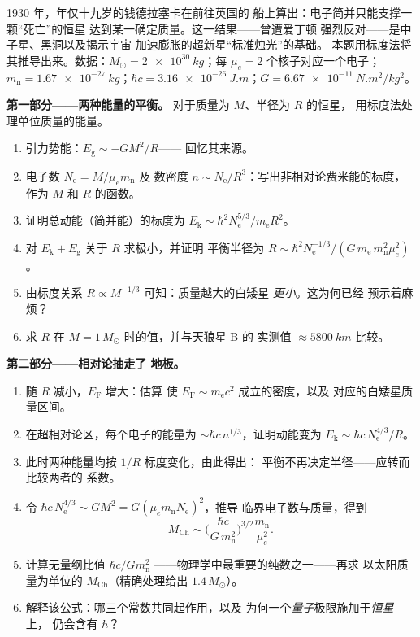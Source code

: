\begin{problem}\label{pb:b3:quantum-statistics:1}
1930 年，年仅十九岁的钱德拉塞卡在前往英国的
船上算出：电子简并只能支撑一颗“死亡”的恒星
达到某一确定质量。这一结果——曾遭爱丁顿
强烈反对——是中子星、黑洞以及揭示宇宙
加速膨胀的超新星“标准烛光”的基础。
本题用标度法将其推导出来。数据：$M_\odot =
\qty{2e30}{kg}$；每 $\mu_e = 2$ 个核子对应一个电子；$m_{\text{
n}} = \qty{1.67e-27}{kg}$；$\hbar c = \qty{3.16e-26}{J.m}$；$G =
\qty{6.67e-11}{N.m^2/kg^2}$。

\medskip\noindent\textbf{第一部分——两种能量的平衡。}
对于质量为 $M$、半径为 $R$ 的恒星，
用标度法处理单位质量的能量。
\begin{enumerate}
  \item 引力势能：$E_{\text{g}} \sim -GM^2/R$——
        回忆其来源。
  \item 电子数 $N_{\text{e}} = M/\mu_e m_{\text{n}}$ 及
        数密度 $n \sim N_{\text{e}}/R^3$：写出非相对论费米能的标度，
        作为 $M$ 和
        $R$ 的函数。
  \item 证明总动能（简并能）的标度为
        $E_{\text{k}} \sim \hbar^2N_{\text{e}}^{5/3}/m_{\text{e}}
        R^2$。
  \item 对 $E_{\text{k}} + E_{\text{g}}$ 关于 $R$ 求极小，并证明
        平衡半径为
        $R \sim \hbar^2 N_{\text{e}}^{-1/3}/(G\,m_{\text{e}}\,
        m_{\text{n}}^2\mu_e^2)$。
  \item 由标度关系 $R \propto M^{-1/3}$ 可知：质量越大的白矮星
        \emph{更小}。这为何已经
        预示着麻烦？
  \item 求 $R$ 在 $M = 1\,M_\odot$ 时的值，并与天狼星 B 的
        实测值 $\approx\qty{5800}{km}$ 比较。
\end{enumerate}

\medskip\noindent\textbf{第二部分——相对论抽走了
地板。}
\begin{enumerate}[resume]
  \item 随 $R$ 减小，$E_{\text{F}}$ 增大：估算
        使 $E_{\text{F}} \sim m_{\text{e}}c^2$ 成立的密度，以及
        对应的白矮星质量区间。
  \item 在超相对论区，每个电子的能量为
        $\sim\hbar c\,n^{1/3}$，证明动能变为
        $E_{\text{k}} \sim \hbar c\,N_{\text{e}}^{4/3}/R$。
  \item 此时两种能量均按 $1/R$ 标度变化，由此得出：
        平衡不再决定半径——应转而比较两者的
        系数。
  \item 令 $\hbar c\,N_{\text{e}}^{4/3} \sim
        GM^2 = G(\mu_em_{\text{n}}N_{\text{e}})^2$，推导
        临界电子数与质量，得到
        \[
        M_{\text{Ch}} \sim
        \Big(\frac{\hbar c}{G\,m_{\text{n}}^2}\Big)^{3/2}
        \frac{m_{\text{n}}}{\mu_e^2} .
        \]
  \item 计算无量纲比值 $\hbar c/Gm_{\text{n}}^2$
        ——物理学中最重要的纯数之一——再求
        以太阳质量为单位的 $M_{\text{Ch}}$（精确处理给出
        $1.4\,M_\odot$）。
  \item 解释该公式：哪三个常数共同起作用，以及
        为何一个\emph{量子}极限施加于\emph{恒星}上，
        仍会含有 $\hbar$？
\end{enumerate}


\end{problem}
